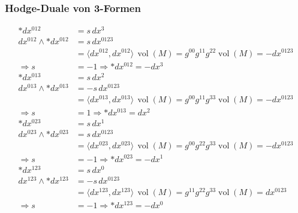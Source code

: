 \subsubsection{Hodge-Duale von 3-Formen}
\begin{align*}
	\ast dx^{012} &= s \, dx^3 \\
	dx^{012} \wedge \ast dx^{012} &= s \, dx^{0123} \\
	&= \langle dx^{012}, dx^{012} \rangle \, \operatorname{vol}(M) 
	= g^{00} g^{11} g^{22} \operatorname{vol}(M) = -dx^{0123} \\
	\Rightarrow s &= -1 \Rightarrow \boxed{\ast dx^{012} = - dx^3}
	\\[1em]
	\ast dx^{013} &= s \, dx^2 \\
	dx^{013} \wedge \ast dx^{013} &= -s \, dx^{0123} \\
	&= \langle dx^{013}, dx^{013} \rangle \, \operatorname{vol}(M) 
	= g^{00} g^{11} g^{33} \operatorname{vol}(M) = -dx^{0123} \\
	\Rightarrow s &= 1 \Rightarrow \boxed{\ast dx^{013} = dx^2}
	\\[1em]
	\ast dx^{023} &= s \, dx^1 \\
	dx^{023} \wedge \ast dx^{023} &= s \, dx^{0123} \\
	&= \langle dx^{023}, dx^{023} \rangle \, \operatorname{vol}(M) 
	= g^{00} g^{22} g^{33} \operatorname{vol}(M) = -dx^{0123} \\
	\Rightarrow s &= -1 \Rightarrow \boxed{\ast dx^{023} = - dx^1}
	\\[1em]
	\ast dx^{123} &= s \, dx^0 \\
	dx^{123} \wedge \ast dx^{123} &= -s \, dx^{0123} \\
	&= \langle dx^{123}, dx^{123} \rangle \, \operatorname{vol}(M)
	= g^{11} g^{22} g^{33} \operatorname{vol}(M) = dx^{0123} \\
	\Rightarrow s &= -1 \Rightarrow \boxed{\ast dx^{123} = - dx^0}
\end{align*}

